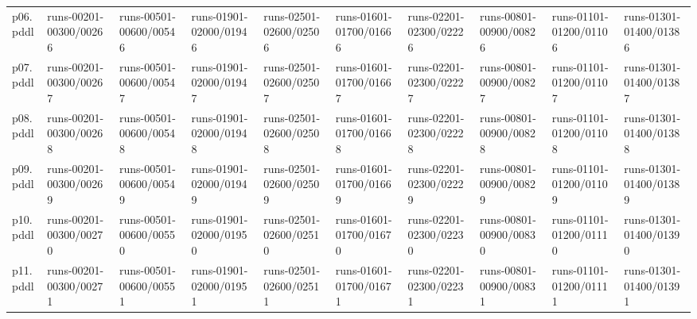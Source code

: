 \documentclass{article}
\begin{document}
\begin{tabular}{@{}lrrrrrrrrr@{}}
p06.pddl & \multicolumn{1}{|l|}{runs-00201-00300/00266} & \multicolumn{1}{|l|}{runs-00501-00600/00546} & \multicolumn{1}{|l|}{runs-01901-02000/01946} & \multicolumn{1}{|l|}{runs-02501-02600/02506} & \multicolumn{1}{|l|}{runs-01601-01700/01666} & \multicolumn{1}{|l|}{runs-02201-02300/02226} & \multicolumn{1}{|l|}{runs-00801-00900/00826} & \multicolumn{1}{|l|}{runs-01101-01200/01106} & \multicolumn{1}{|l|}{runs-01301-01400/01386} \\
p07.pddl & \multicolumn{1}{|l|}{runs-00201-00300/00267} & \multicolumn{1}{|l|}{runs-00501-00600/00547} & \multicolumn{1}{|l|}{runs-01901-02000/01947} & \multicolumn{1}{|l|}{runs-02501-02600/02507} & \multicolumn{1}{|l|}{runs-01601-01700/01667} & \multicolumn{1}{|l|}{runs-02201-02300/02227} & \multicolumn{1}{|l|}{runs-00801-00900/00827} & \multicolumn{1}{|l|}{runs-01101-01200/01107} & \multicolumn{1}{|l|}{runs-01301-01400/01387} \\
p08.pddl & \multicolumn{1}{|l|}{runs-00201-00300/00268} & \multicolumn{1}{|l|}{runs-00501-00600/00548} & \multicolumn{1}{|l|}{runs-01901-02000/01948} & \multicolumn{1}{|l|}{runs-02501-02600/02508} & \multicolumn{1}{|l|}{runs-01601-01700/01668} & \multicolumn{1}{|l|}{runs-02201-02300/02228} & \multicolumn{1}{|l|}{runs-00801-00900/00828} & \multicolumn{1}{|l|}{runs-01101-01200/01108} & \multicolumn{1}{|l|}{runs-01301-01400/01388} \\
p09.pddl & \multicolumn{1}{|l|}{runs-00201-00300/00269} & \multicolumn{1}{|l|}{runs-00501-00600/00549} & \multicolumn{1}{|l|}{runs-01901-02000/01949} & \multicolumn{1}{|l|}{runs-02501-02600/02509} & \multicolumn{1}{|l|}{runs-01601-01700/01669} & \multicolumn{1}{|l|}{runs-02201-02300/02229} & \multicolumn{1}{|l|}{runs-00801-00900/00829} & \multicolumn{1}{|l|}{runs-01101-01200/01109} & \multicolumn{1}{|l|}{runs-01301-01400/01389} \\
p10.pddl & \multicolumn{1}{|l|}{runs-00201-00300/00270} & \multicolumn{1}{|l|}{runs-00501-00600/00550} & \multicolumn{1}{|l|}{runs-01901-02000/01950} & \multicolumn{1}{|l|}{runs-02501-02600/02510} & \multicolumn{1}{|l|}{runs-01601-01700/01670} & \multicolumn{1}{|l|}{runs-02201-02300/02230} & \multicolumn{1}{|l|}{runs-00801-00900/00830} & \multicolumn{1}{|l|}{runs-01101-01200/01110} & \multicolumn{1}{|l|}{runs-01301-01400/01390} \\
p11.pddl & \multicolumn{1}{|l|}{runs-00201-00300/00271} & \multicolumn{1}{|l|}{runs-00501-00600/00551} & \multicolumn{1}{|l|}{runs-01901-02000/01951} & \multicolumn{1}{|l|}{runs-02501-02600/02511} & \multicolumn{1}{|l|}{runs-01601-01700/01671} & \multicolumn{1}{|l|}{runs-02201-02300/02231} & \multicolumn{1}{|l|}{runs-00801-00900/00831} & \multicolumn{1}{|l|}{runs-01101-01200/01111} & \multicolumn{1}{|l|}{runs-01301-01400/01391} \\

\end{tabular}
\end{document}

